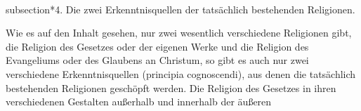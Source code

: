 \\subsection*{4. Die zwei Erkenntnisquellen der tatsächlich bestehenden Religionen.}

Wie es auf den Inhalt gesehen, nur zwei wesentlich verschiedene Religionen gibt, die Religion des Gesetzes oder der eigenen Werke und die Religion des Evangeliums oder des Glaubens an Christum, so gibt es auch nur zwei verschiedene Erkenntnisquellen (principia cognoscendi), aus denen die tatsächlich bestehenden Religionen geschöpft werden. Die Religion des Gesetzes in ihren verschiedenen Gestalten außerhalb und innerhalb der äußeren